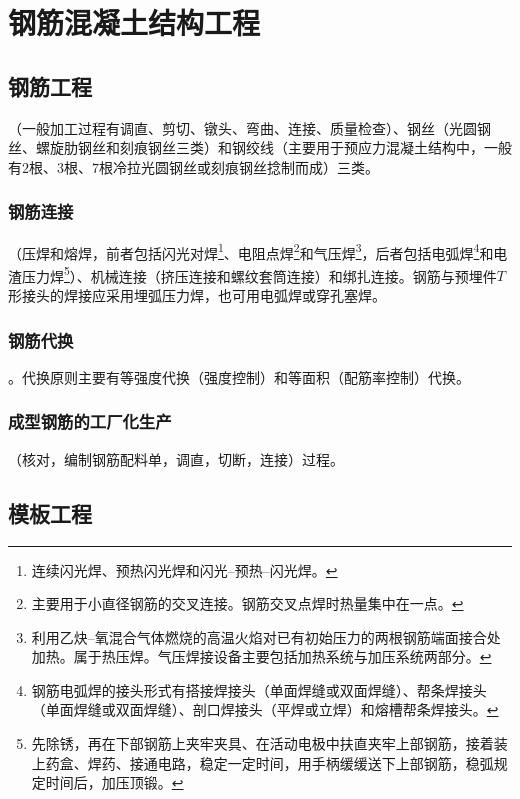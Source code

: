 \documentclass{book}
\begin{document}
\chapter{钢筋混凝土结构工程}
\section{钢筋工程}
（一般加工过程有调直、剪切、镦头、弯曲、连接、质量检查）、钢丝（光圆钢丝、螺旋肋钢丝和刻痕钢丝三类）和钢绞线（主要用于预应力混凝土结构中，一般有$2$根、$3$根、$7$根冷拉光圆钢丝或刻痕钢丝捻制而成）三类。
\subsection{钢筋连接}
（压焊和熔焊，前者包括闪光对焊\footnote{连续闪光焊、预热闪光焊和闪光--预热--闪光焊。}、电阻点焊\footnote{主要用于小直径钢筋的交叉连接。钢筋交叉点焊时热量集中在一点。}和气压焊\footnote{利用乙炔--氧混合气体燃烧的高温火焰对已有初始压力的两根钢筋端面接合处加热。属于热压焊。气压焊接设备主要包括加热系统与加压系统两部分。}，后者包括电弧焊\footnote{钢筋电弧焊的接头形式有搭接焊接头（单面焊缝或双面焊缝）、帮条焊接头（单面焊缝或双面焊缝）、剖口焊接头（平焊或立焊）和熔槽帮条焊接头。}和电渣压力焊\footnote{先除锈，再在下部钢筋上夹牢夹具、在活动电极中扶直夹牢上部钢筋，接着装上药盒、焊药、接通电路，稳定一定时间，用手柄缓缓送下上部钢筋，稳弧规定时间后，加压顶锻。}）、机械连接（挤压连接和螺纹套筒连接）和绑扎连接。钢筋与预埋件$T$形接头的焊接应采用埋弧压力焊，也可用电弧焊或穿孔塞焊。
\subsection{钢筋代换}
。代换原则主要有等强度代换（强度控制）和等面积（配筋率控制）代换。
\subsection{成型钢筋的工厂化生产}
（核对，编制钢筋配料单，调直，切断，连接）过程。
\section{模板工程}
\end{document}
